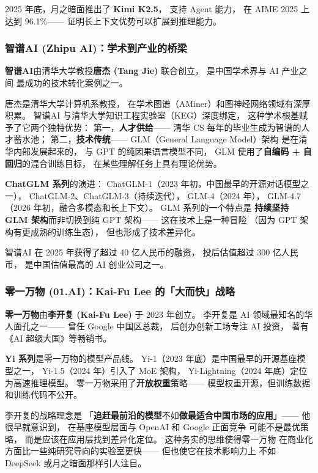 2025 年底，月之暗面推出了 \textbf{Kimi K2.5}，
支持 Agent 能力，
在 AIME 2025 上达到 96.1\%——
证明长上下文优势可以扩展到推理能力。

\subsubsection{智谱AI (Zhipu AI)：学术到产业的桥梁}

\textbf{智谱AI}由清华大学教授\textbf{唐杰 (Tang Jie)} 联合创立，
是中国学术界与 AI 产业之间
最成功的技术转化案例之一。

唐杰是清华大学计算机系教授，
在学术图谱（AMiner）和图神经网络领域有深厚积累。
智谱AI 与清华大学知识工程实验室（KEG）深度绑定，
这种学术根基赋予了它两个独特优势：
第一，\textbf{人才供给}——
清华 CS 每年的毕业生成为智谱的人才蓄水池；
第二，\textbf{技术传统}——
GLM（General Language Model）架构
是在清华内部发展起来的，
与 GPT 的纯因果语言模型不同，
GLM 使用了\textbf{自编码 + 自回归}的混合训练目标，
在某些理解任务上具有理论优势。

\textbf{ChatGLM 系列}的演进：
ChatGLM-1（2023 年初，中国最早的开源对话模型之一），
ChatGLM-2、ChatGLM-3（持续迭代），
GLM-4（2024 年），
GLM-4.7（2026 年初，融合多模态和长上下文）。
GLM 系列的一个特点是
\textbf{持续坚持 GLM 架构}而非切换到纯 GPT 架构——
这在技术上是一种冒险
（因为 GPT 架构有更成熟的训练生态），
但也形成了技术差异化。

智谱AI 在 2025 年获得了超过 40 亿人民币的融资，
投后估值超过 300 亿人民币，
是中国估值最高的 AI 创业公司之一。

\subsubsection{零一万物 (01.AI)：Kai-Fu Lee 的「大而快」战略}

\textbf{零一万物}由\textbf{李开复 (Kai-Fu Lee)} 于 2023 年创立。
李开复是 AI 领域最知名的华人面孔之一——
曾任 Google 中国区总裁，
后创办创新工场专注 AI 投资，
著有《AI 超级大国》等畅销书。

\textbf{Yi 系列}是零一万物的模型产品线。
Yi-1（2023 年底）是中国最早的开源基座模型之一，
Yi-1.5（2024 年）引入了 MoE 架构，
Yi-Lightning（2024 年底）定位为高速推理模型。
零一万物采用了\textbf{开放权重}策略——
模型权重开源，但训练数据和训练代码不公开。

李开复的战略理念是
「\textbf{追赶最前沿的模型}不如\textbf{做最适合中国市场的应用}」——
他很早就意识到，
在基座模型层面与 OpenAI 和 Google 正面竞争
可能不是最优策略，
而是应该在应用层找到差异化定位。
这种务实的思维使得零一万物
在商业化方面比一些纯研究导向的实验室更快——
但也使它在技术影响力上
不如 DeepSeek 或月之暗面那样引人注目。

